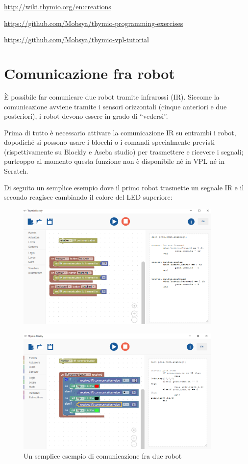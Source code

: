 \documentclass[12pt]{article}
\begin{document}
		\url{http://wiki.thymio.org/en:creations}
		
		\url{https://github.com/Mobsya/thymio-programming-exercises}
		
		\url{https://github.com/Mobsya/thymio-vpl-tutorial}
	
	
\section{Comunicazione fra robot}\label{network}

	È possibile far comunicare due robot tramite infrarossi (IR). Siccome la comunicazione avviene tramite i sensori orizzontali (cinque anteriori e due posteriori), i robot devono essere in grado di ``vedersi''.
	
	Prima di tutto è necessario attivare la comunicazione IR su entrambi i robot, dopodiché si possono usare i blocchi o i comandi specialmente previsti (rispettivamente su Blockly e Aseba studio) per trasmettere e ricevere i segnali; purtroppo al momento questa funzione non è disponibile né in VPL né in Scratch.
	
	Di seguito un semplice esempio dove il primo robot trasmette un segnale IR e il secondo reagisce cambiando il colore del LED superiore: 
	
	\begin{figure}[H]
		\centering
		\includegraphics[width=0.9\textwidth]{img/blocklyIR1.png}
		\label{blocklyIR1}
	\end{figure}
		
	\begin{figure}[H]
		\centering
		\includegraphics[width=0.9\textwidth]{img/blocklyIR2.png}
		\caption{Un semplice esempio di comunicazione fra due robot}
		\label{blocklyIR2}
	\end{figure}
	
\end{document}
